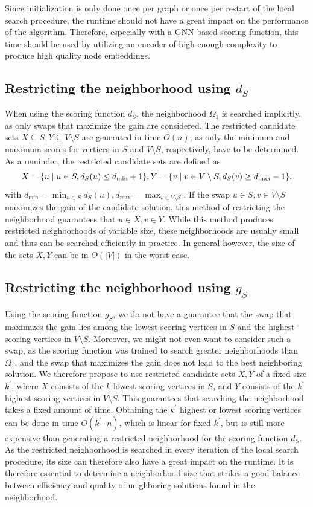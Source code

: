 \documentclass[draft,final]{vutinfth} %
\begin{document}
Since initialization is only done once per graph or once per restart of the local search procedure, the runtime should not have a great impact on the performance of the algorithm. Therefore, especially with a GNN based scoring function, this time should be used by utilizing an encoder of high enough complexity to produce high quality node embeddings. 

\subsection{Restricting the neighborhood using $d_S$}
When using the scoring function $d_S$, the neighborhood $\Omega_1$ is searched implicitly, as only swaps that maximize the gain are considered. 
The restricted candidate sets $X \subseteq S, Y \subseteq V \setminus S$ are generated in time $O(n)$, as only the minimum and maximum scores for vertices in $S$ and $V \setminus S$, respectively, have to be determined. As a reminder, the restricted candidate sets are defined as 
\[
    X = \{ u \mid u \in S, d_S(u) \leq d_{\min} + 1 \}, \\
    Y = \{ v \mid v \in V \setminus S, d_S(v) \geq d_{\max} - 1 \},
\]
with $d_{\min} = \min_{u \in S} d_S(u), d_{\max} = \max_{v \in V \setminus S}$. 
If the swap $u \in S,v \in V \setminus S$ maximizes the gain of the candidate solution, this method of restricting the neighborhood guarantees that $u \in X, v \in Y$.
While this method produces restricted neighborhoods of variable size, these neighborhoods are usually small and thus can be searched efficiently in practice. In general however, the size of the sets $X, Y$ can be in $O(|V|)$ in the worst case. 

\subsection{Restricting the neighborhood using $g_S$}

Using the scoring function $g_S$, we do not have a guarantee that the swap that maximizes the gain lies among the lowest-scoring vertices in $S$ and the highest-scoring vertices in $V \setminus S$. Moreover, we might not even want to consider such a swap, as the scoring function was trained to search greater neighborhoods than $\Omega_1$, and the swap that maximizes the gain does not lead to the best neighboring solution. We therefore propose to use restricted candidate sets $X,Y$ of a fixed size $k^\prime$, where $X$ consists of the $k$ lowest-scoring vertices in $S$, and $Y$ consists of the $k^\prime$ highest-scoring vertices in $V \setminus S$. This guarantees that searching the neighborhood takes a fixed amount of time. 
Obtaining the $k^\prime$ highest or lowest scoring vertices can be done in time $O(k^\prime \cdot n)$, which is linear for fixed $k^\prime$, but is still more expensive than generating a restricted neighborhood for the scoring function $d_S$. As the restricted neighborhood is searched in every iteration of the local search procedure, its size can therefore also have a great impact on the runtime. It is therefore essential to determine a neighborhood size that strikes a good balance between efficiency and quality of neighboring solutions found in the neighborhood.  
\end{document}
